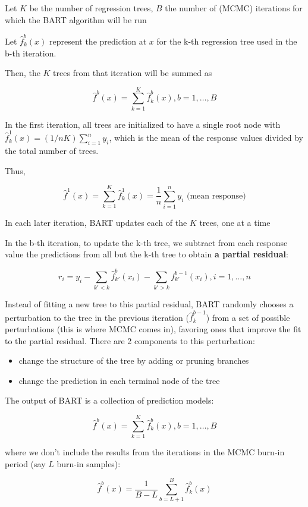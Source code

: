 \documentclass[
]{book}
\begin{document}
Let \(K\) be the number of regression trees, \(B\) the number of (MCMC) iterations for which the BART algorithm will be run

Let \(\hat{f}_k^b(x)\) represent the prediction at \(x\) for the k-th regression tree used in the b-th iteration.

Then, the \(K\) trees from that iteration will be summed as

\[
\hat{f}^b(x) = \sum_{k=1}^K \hat{f}_k^b(x), b = 1, \dots, B
\]

In the first iteration, all trees are initialized to have a single root node with \(\hat{f}_k^1(x) = (1/nK)\sum_{i=1}^n y_i\), which is the mean of the response values divided by the total number of trees.

Thus,

\[
\hat{f}^1(x) = \sum_{k=1}^K \hat{f}_k^1 (x) = \frac{1}{n} \sum_{i=1}^n y_i \text{ (mean response)}
\]

In each later iteration, BART updates each of the \(K\) trees, one at a time

In the b-th iteration, to update the k-th tree, we subtract from each response value the predictions from all but the k-th tree to obtain \textbf{a partial residual}:

\[
r_i = y_i - \sum_{k'<k} \hat{f}_{k'}^b (x_i) - \sum_{k'>k} f_{k'}^{b-1}(x_i), i = 1, \dots, n
\]

Instead of fitting a new tree to this partial residual, BART randomly chooses a perturbation to the tree in the previous iteration (\(\hat{f}_k^{b-1}\)) from a set of possible perturbations (this is where MCMC comes in), favoring ones that improve the fit to the partial residual. There are 2 components to this perturbation:

\begin{itemize}
\item
  change the structure of the tree by adding or pruning branches
\item
  change the prediction in each terminal node of the tree
\end{itemize}

The output of BART is a collection of prediction models:

\[
\hat{f}^b(x) = \sum_{k =1}^K \hat{f}_k^b (x) , b = 1, \dots, B
\]

where we don't include the results from the iterations in the MCMC burn-in period (say \(L\) burn-in samples):

\[
\hat{f}^b(x) = \frac{1}{B - L} \sum_{b = L +1}^B \hat{f}_k^b (x) 
\]
\end{document}
